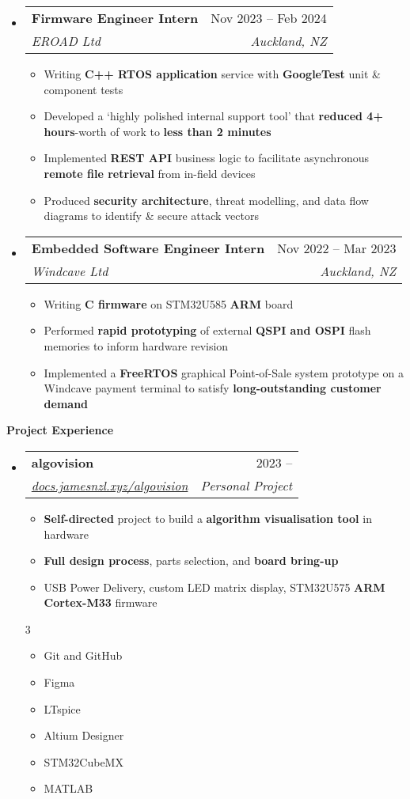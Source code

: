 \documentclass[11pt,a4paper]{article}[leftmargin=*]
\makeatletter
\def \entryspacing {-0pt}
\def \bulletstylei {\faAngleRight\hspace{-4.5pt}}
\def \bulletstyleii {\faCaretRight\hspace{-4.5pt}}
\renewcommand{\section}[2]{\vspace{5pt}
  \colorbox{secondary}{\color{white}\raggedbottom\normalsize\textbf{{#1}{\hspace{2pt}#2\hspace{4pt}}}}
}
\newcommand{\resumeEntryStart}{\begin{itemize}[leftmargin=2.5mm]}
\newcommand{\resumeEntryEnd}{\end{itemize}\vspace{\entryspacing}}
\newcommand{\resumeItemListStart}{\begin{itemize}[leftmargin=4.5mm]}
\newcommand{\resumeItemListEnd}{\end{itemize}}
\newcommand{\resumeItemListStartColumns}[2][-0.5]{\vspace*{#1\multicolsep}
\begin{multicols}{#2}\begin{itemize}[leftmargin=4.5mm]}
\newcommand{\resumeItemListEndColumns}[1][-1]{\end{itemize}\end{multicols}\vspace*{#1\multicolsep}}
\newcommand{\resumeItem}[2][\bulletstylei]{
  \item[\small#1]\small{
    {#2 \vspace{-2pt}}
  }
}
\newcommand{\resumeEntryTSDL}[4]{
  \vspace{-1pt}\item[]
    \begin{tabularx}{0.97\textwidth}{X@{\hspace{60pt}}r}
      \textbf{\color{primary}#1} & {\firabook\color{accent}\small#2} \\
      \textit{\color{accent}\small#3} & \textit{\color{accent}\small#4} \\
    \end{tabularx}\vspace{-6pt}
}
\newcommand{\resumeBf}[1]{\small\textbf{\color{halfbold}#1}}
\makeatother
\begin{document}
\resumeEntryStart
\resumeEntryTSDL
{Firmware Engineer Intern}{Nov 2023 -- Feb 2024}
{EROAD Ltd}{Auckland, NZ}

\resumeItemListStart
\resumeItem {Writing \resumeBf{C++ RTOS application} service with \resumeBf{GoogleTest} unit \& component tests}
\resumeItem {Developed a `highly polished internal support tool' that \resumeBf{reduced 4+ hours}-worth of work to \resumeBf{less than 2 minutes}}
\resumeItem {Implemented \resumeBf{REST API} business logic to facilitate asynchronous \resumeBf{remote file retrieval} from in-field devices}
\resumeItem {Produced \resumeBf{security architecture}, threat modelling, and data flow diagrams to identify \& secure attack vectors}
\resumeItemListEnd
\resumeEntryEnd

\resumeEntryStart
\resumeEntryTSDL
{Embedded Software Engineer Intern}{Nov 2022 -- Mar 2023}
{Windcave Ltd}{Auckland, NZ}

\resumeItemListStart
\resumeItem {Writing \resumeBf{C firmware} on STM32U585 \resumeBf{ARM} board}
\resumeItem {Performed \resumeBf{rapid prototyping} of external \resumeBf{QSPI and OSPI} flash memories to inform hardware revision}
\resumeItem {Implemented a \resumeBf{FreeRTOS} graphical Point-of-Sale system prototype on a Windcave payment terminal to satisfy \resumeBf{long-outstanding customer demand}}
\resumeItemListEnd
\resumeEntryEnd

\pagebreak


\section{\faFlask}{Project Experience}

\resumeEntryStart
\resumeEntryTSDL
{algovision}{2023 --}
{\href{https://docs.jamesnzl.xyz/algovision}{docs.jamesnzl.xyz/algovision}}{Personal Project}
\resumeItemListStart
\resumeItem {\resumeBf{Self-directed} project to build a \resumeBf{algorithm visualisation tool} in hardware}
\resumeItem {\resumeBf{Full design process}, parts selection, and \resumeBf{board bring-up}}
\resumeItem {USB Power Delivery, custom LED matrix display, STM32U575 \resumeBf{ARM Cortex-M33} firmware}
\resumeItemListEnd
\resumeItemListStartColumns{3}
\resumeItem[\bulletstyleii] {Git and GitHub}
\resumeItem[\bulletstyleii] {Figma}
\resumeItem[\bulletstyleii] {LTspice}
\resumeItem[\bulletstyleii] {Altium Designer}
\resumeItem[\bulletstyleii] {STM32CubeMX}
\resumeItem[\bulletstyleii] {MATLAB}
\resumeItemListEndColumns
\resumeEntryEnd
\end{document}
